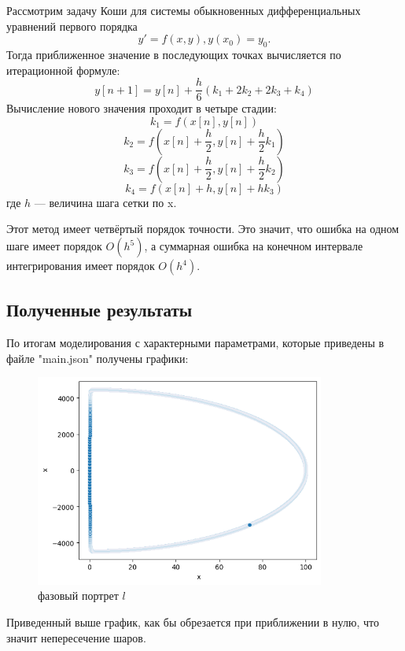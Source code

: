 \documentclass[a4paper, 12pt]{article}
\begin{document}
Рассмотрим задачу Коши для системы обыкновенных дифференциальных уравнений первого порядка 
    \[y\prime  = f(x,y),y(x_0)=y_0.\]
Тогда приближенное значение в последующих точках вычисляется по итерационной формуле:
    \[y[n+1] = y[n] + \frac{h}{6}( k_1 + 2 k_2 + 2 k_3 +k_4)\]
Вычисление нового значения проходит в четыре стадии:
    \[k_1 = f ( x[n] , y[n] )\]
    \[k_2 = f ( x [n] + \frac{h}{2} , y[ n] + \frac{h}{2} k_1 ) \]
    \[k_3 = f ( x [n] +\frac{h}{2} , y[ n] + \frac{h}{2} k_2 ) \]
    \[k_4 = f ( x [n] + h , y[ n] + h k_3 ) \]
где $h$ — величина шага сетки по x.

Этот метод имеет четвёртый порядок точности. Это значит, что ошибка на одном шаге имеет порядок $O(h^5)$, а суммарная ошибка на конечном интервале интегрирования имеет порядок $O(h^4)$.
\newpage
\subsection{Полученные результаты}
По итогам моделирования с характерными параметрами, которые приведены в файле "main.json" получены графики:
 \begin{figure}[H]
  \centering
  \includegraphics[width = 0.85\textwidth, height = 0.20\textheight]{pictures/data/image.png}
  \caption{фазовый портрет $l$}
 \end{figure}
    Приведенный выше график, как бы обрезается при приближении в нулю, что значит непересечение шаров.
\end{document}

